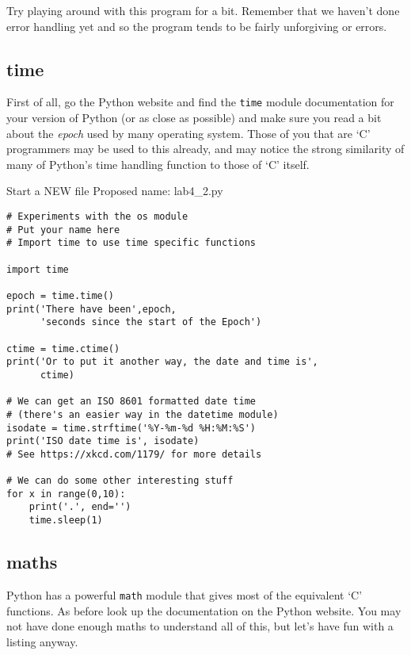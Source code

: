 \documentclass[12pt,oneside]{cttutorial}
\begin{document}
Try playing around with this program for a bit. Remember that we haven't done error handling yet and so the program tends to be fairly unforgiving or errors.

\subsection{time}

First of all, go the Python website and find the \lstinline!time! module documentation for your version of Python (or as close as possible) and make sure you read a bit about the \emph{epoch} used by many operating system. Those of you that are `C' programmers may be used to this already, and may notice the strong similarity of many of Python's time handling function to those of `C' itself.

\alert{Start a NEW file}
Proposed name: lab4\_2.py
\begin{lstlisting}
# Experiments with the os module
# Put your name here
# Import time to use time specific functions

import time

epoch = time.time()
print('There have been',epoch,
      'seconds since the start of the Epoch')

ctime = time.ctime()
print('Or to put it another way, the date and time is',
      ctime)

# We can get an ISO 8601 formatted date time
# (there's an easier way in the datetime module)
isodate = time.strftime('%Y-%m-%d %H:%M:%S')
print('ISO date time is', isodate)
# See https://xkcd.com/1179/ for more details

# We can do some other interesting stuff
for x in range(0,10):
    print('.', end='')
    time.sleep(1)

\end{lstlisting}


\subsection{maths}

Python has a powerful \lstinline!math! module that gives most of the equivalent `C' functions. As before look up the documentation on the Python website. You may not have done enough maths to understand all of this, but let's have fun with a listing anyway.
\end{document}
